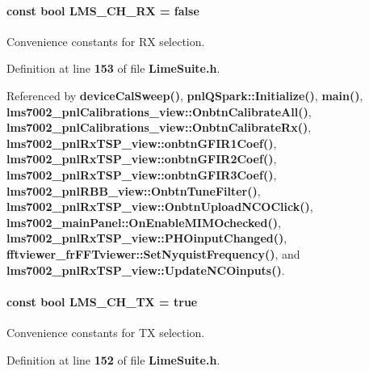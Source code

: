 \paragraph[{L\+M\+S\+\_\+\+C\+H\+\_\+\+RX}]{\setlength{\rightskip}{0pt plus 5cm}const bool L\+M\+S\+\_\+\+C\+H\+\_\+\+RX = false\hspace{0.3cm}{\ttfamily [static]}}\label{group__FN__HIGH__LVL_ga6315347ecc9dbff0d1ead974be3e8885}


Convenience constants for RX selection. 



Definition at line {\bf 153} of file {\bf Lime\+Suite.\+h}.



Referenced by {\bf device\+Cal\+Sweep()}, {\bf pnl\+Q\+Spark\+::\+Initialize()}, {\bf main()}, {\bf lms7002\+\_\+pnl\+Calibrations\+\_\+view\+::\+Onbtn\+Calibrate\+All()}, {\bf lms7002\+\_\+pnl\+Calibrations\+\_\+view\+::\+Onbtn\+Calibrate\+Rx()}, {\bf lms7002\+\_\+pnl\+Rx\+T\+S\+P\+\_\+view\+::onbtn\+G\+F\+I\+R1\+Coef()}, {\bf lms7002\+\_\+pnl\+Rx\+T\+S\+P\+\_\+view\+::onbtn\+G\+F\+I\+R2\+Coef()}, {\bf lms7002\+\_\+pnl\+Rx\+T\+S\+P\+\_\+view\+::onbtn\+G\+F\+I\+R3\+Coef()}, {\bf lms7002\+\_\+pnl\+R\+B\+B\+\_\+view\+::\+Onbtn\+Tune\+Filter()}, {\bf lms7002\+\_\+pnl\+Rx\+T\+S\+P\+\_\+view\+::\+Onbtn\+Upload\+N\+C\+O\+Click()}, {\bf lms7002\+\_\+main\+Panel\+::\+On\+Enable\+M\+I\+M\+Ochecked()}, {\bf lms7002\+\_\+pnl\+Rx\+T\+S\+P\+\_\+view\+::\+P\+H\+Oinput\+Changed()}, {\bf fftviewer\+\_\+fr\+F\+F\+Tviewer\+::\+Set\+Nyquist\+Frequency()}, and {\bf lms7002\+\_\+pnl\+Rx\+T\+S\+P\+\_\+view\+::\+Update\+N\+C\+Oinputs()}.

\paragraph[{L\+M\+S\+\_\+\+C\+H\+\_\+\+TX}]{\setlength{\rightskip}{0pt plus 5cm}const bool L\+M\+S\+\_\+\+C\+H\+\_\+\+TX = true\hspace{0.3cm}{\ttfamily [static]}}\label{group__FN__HIGH__LVL_ga8b66470dd0604888079174a9f9a96daa}


Convenience constants for TX selection. 



Definition at line {\bf 152} of file {\bf Lime\+Suite.\+h}.



